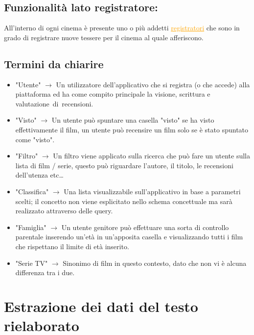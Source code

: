 \documentclass[a4paper,12pt]{report}
\begin{document}
	\subsection{Funzionalità lato registratore:}
	All'interno di ogni cinema è presente uno o più addetti \textcolor{orange}{\underline{registratori}} che sono in grado di registrare nuove tessere per il cinema al quale afferiscono.
	
	\subsection{Termini da chiarire}\label{ss:terminologia}
	\begin{itemize}
		\item "Utente" $\longrightarrow$ Un utilizzatore dell'applicativo che si registra (o che accede) alla piattaforma ed ha come compito principale la visione, scrittura e valutazione di recensioni.
		\item "Visto" $\longrightarrow$ Un utente può spuntare una casella "visto" se ha visto effettivamente il film, un utente può recensire un film solo se è stato spuntato come "visto".
		\item "Filtro" $\longrightarrow$ Un filtro viene applicato sulla ricerca che può fare un utente sulla lista di film / serie, questo può riguardare l'autore, il titolo, le recensioni dell'utenza etc\dots
		\item "Classifica" $\longrightarrow$ Una lista visualizzabile sull'applicativo in base a parametri scelti; il concetto non viene esplicitato nello schema concettuale ma sarà realizzato attraverso delle query.
		\item "Famiglia" $\longrightarrow$ Un utente genitore può effettuare una sorta di controllo parentale inserendo un'età in un'apposita casella e visualizzando tutti i film che rispettano il limite di età inserito.
		\item "Serie TV" $\longrightarrow$ Sinonimo di film in questo contesto, dato che non vi è alcuna differenza tra i due.
	\end{itemize}
	\section{Estrazione dei dati del testo rielaborato}
\end{document}

